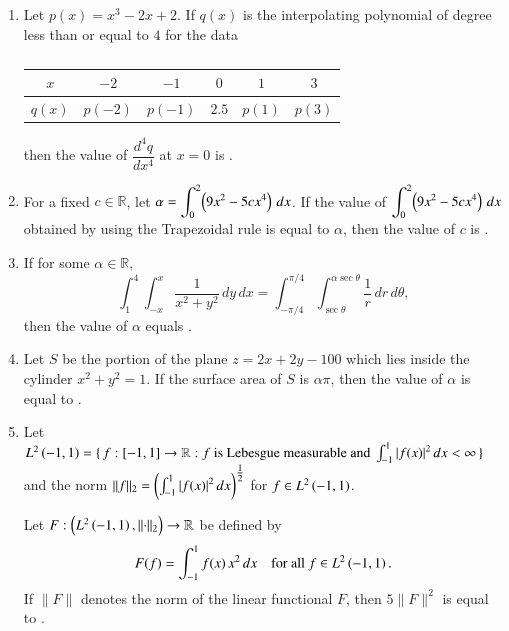 \documentclass[journal,12pt,onecolumn]{IEEEtran}
\theoremstyle{remark}
\begin{document}
\begin{enumerate}[start=1, label=Q.\arabic*]
\hfill{}
\item Let $p(x)=x^{3}-2x+2$. If $q(x)$ is the interpolating polynomial of degree less than or equal to $4$ for the data
\begin{table}[H]
\centering
\caption*{}
\label{tab:q28data}
\begin{tabular}{c|ccccc}
$x$ & $-2$ & $-1$ & $0$ & $1$ & $3$ \\
\hline
$q(x)$ & $p(-2)$ & $p(-1)$ & $2.5$ & $p(1)$ & $p(3)$
\end{tabular}
\end{table}
then the value of $\dfrac{d^{4}q}{dx^{4}}$ at $x=0$ is \underline{\hspace{2cm}}.

\hfill{}


\item For a fixed $c \in \mathbb{R}$, let $\alpha=\displaystyle \int_{0}^{2}\!\left(9x^{2}-5cx^{4}\right)\,dx$. If the value of $\displaystyle \int_{0}^{2}\!\left(9x^{2}-5cx^{4}\right)\,dx$ obtained by using the Trapezoidal rule is equal to $\alpha$, then the value of $c$ is \underline{\hspace{2cm}} .

\hfill{}


\item If for some $\alpha \in \mathbb{R}$,
\[
\int_{1}^{4}\int_{-x}^{x}\frac{1}{x^{2}+y^{2}}\,dy\,dx
=
\int_{-\pi/4}^{\pi/4}\int_{\sec\theta}^{\alpha \sec\theta}\frac{1}{r}\,dr\,d\theta,
\]
then the value of $\alpha$ equals \underline{\hspace{2cm}}.

\hfill{}


\item Let $S$ be the portion of the plane $z=2x+2y-100$ which lies inside the cylinder $x^{2}+y^{2}=1$. If the surface area of $S$ is $\alpha \pi$, then the value of $\alpha$ is equal to \underline{\hspace{2cm}}.

\hfill{}


\item Let $L^{2}\left(-1,1\right)=\{\, f : [-1,1]\to \mathbb{R} : f \text{ is Lebesgue measurable and } \int_{-1}^{1}\left\vert f(x)\right\vert^{2}dx<\infty \,\}$ and the norm $\lVert f\rVert_{2}=\left(\int_{-1}^{1}\left\vert f(x)\right\vert^{2}dx\right)^{\tfrac{1}{2}}$ for $f\in L^{2}\left(-1,1\right)$.  

Let $F: \left(L^{2}\left(-1,1\right),\lVert\cdot\rVert_{2}\right)\to \mathbb{R}$ be defined by
\[
F(f)=\int_{-1}^{1}f(x)\,x^{2}\,dx \quad \text{for all } f\in L^{2}\left(-1,1\right).
\]
If $\lVert F\rVert$ denotes the norm of the linear functional $F$, then $5\lVert F\rVert^{2}$ is equal to \underline{\hspace{2cm}}.


\end{enumerate}
\end{document}

